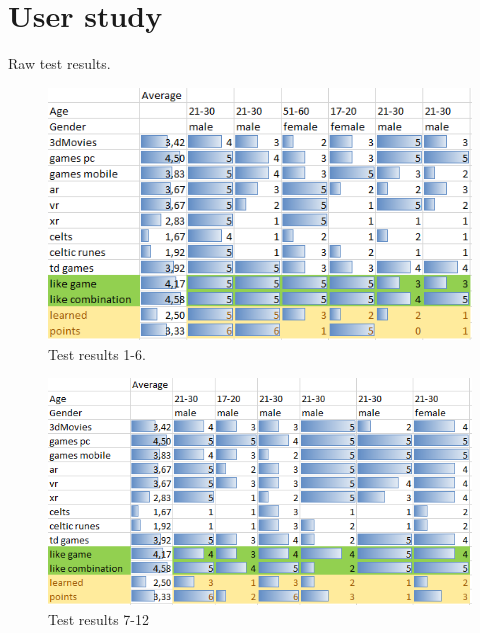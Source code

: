 \clearpage
\pagebreak
\vspace*{-3.5cm}
\section{User study}
\label{appendix-userstudy}

Raw test results.

\begin{figure}[H]
	\centering
	\includegraphics[width=0.95\linewidth]{figures/test-results1.png}
	\caption{Test results 1-6.}
	\label{fig:test-result1}
\end{figure}

\begin{figure}[H]
	\centering
	\includegraphics[width=0.95\linewidth]{figures/test-results2.png}
	\caption{Test results 7-12}
		\label{fig:test-result1}
\end{figure}



